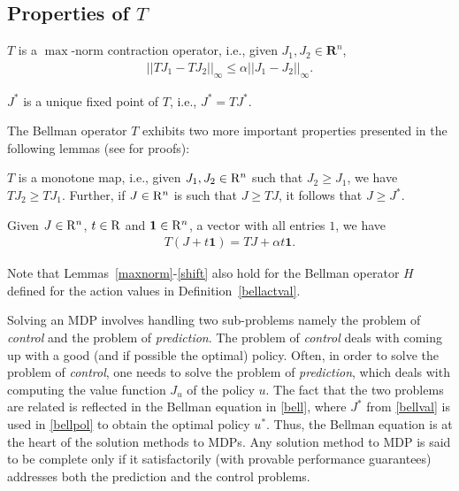 \subsection{Properties of $T$}
\begin{lemma}\label{maxnorm}
$T$ is a $\max$-norm contraction operator, i.e., given $J_1, J_2 \in \mathbf{R}^n$,
\begin{align}
||TJ_1-TJ_2||_\infty\leq \alpha ||J_1-J_2||_\infty.
\end{align}
\end{lemma}
\begin{corollary}\label{uniquesol}
$J^*$ is a unique fixed point of $T$, i.e., $J^*=TJ^*$.
\end{corollary}
The Bellman operator $T$ exhibits two more important properties presented in the following lemmas (see \cite{BertB} for proofs):
\begin{lemma}\label{monotone}
$T$ is a monotone map, i.e., given $J_1,J_2 \in \mathrm{R}^n$ such that $J_2\geq J_1$, we have $T J_2\geq T J_1$. Further, if $J\in \mathrm{R}^n$ is such that $J\geq TJ$, it follows that $J\geq J^*$.
\end{lemma}
\begin{lemma}\label{shift}
Given $J\in \mathrm{R}^n$, $t \in \mathrm{R}$ and $\mathbf{1} \in \mathrm{R}^n$, a vector with all entries $1$, we have
\begin{align}
T(J+t\mathbf{1})=TJ+\alpha t\mathbf{1}.
\end{align}
\end{lemma}
Note that Lemmas~\ref{maxnorm}-\ref{shift} also hold for the Bellman operator $H$ defined for the action values in Definition~\ref{bellactval}.\par
Solving an MDP involves handling two sub-problems namely the problem of \emph{control} and the problem of \emph{prediction}. The problem of \emph{control} deals with coming up with a good (and if possible the optimal) policy. Often, in order to solve the problem of \emph{control}, one needs to solve the problem of \emph{prediction}, which deals with computing the value function $J_u$ of the policy $u$. The fact that the two problems are related is reflected in the Bellman equation in \eqref{bell}, where $J^*$ from \eqref{bellval} is used in \eqref{bellpol} to obtain the optimal policy $u^*$. Thus, the Bellman equation is at the heart of the solution methods to MDPs. Any solution method to MDP is said to be complete only if it satisfactorily (with provable performance guarantees) addresses both the prediction and the control problems. \\
